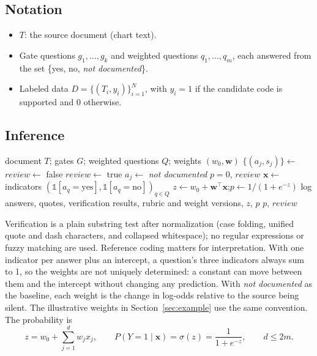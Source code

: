 \documentclass[10pt,letterpaper]{article}
\newcommand{\nd}{\textit{not documented}}
\newcommand{\ind}{\mathbb{1}}
\begin{document}
\FloatBarrier
\subsection{Notation}
\begin{itemize}
  \item $T$: the source document (chart text).
  \item Gate questions $g_1,\dots,g_k$ and weighted questions $q_1,\dots,q_m$, each answered from the set \{yes, no, \nd\}.
  \item Labeled data $D=\{(T_i,y_i)\}_{i=1}^{N}$, with $y_i=1$ if the candidate code is supported and 0 otherwise.
\end{itemize}

\FloatBarrier
\subsection{Inference}

\begin{algorithm}[h]
\caption{Scoring one document with a frozen weight table}
\begin{algorithmic}[1]
\Require document $T$; gates $G$; weighted questions $Q$; weights $(w_0,\mathbf{w})$
\State $\{(a_j,s_j)\}\gets$  
\State $\mathit{review}\gets$ false
     \State $\mathit{review}\gets$ true \EndIf
    \State $a_j\gets$ \nd {}
  \EndIf
\EndFor
{} \State \Return $p=0$, $\mathit{review}$ \EndIf
\State $\mathbf{x}\gets$ indicators $(\ind[a_q=\text{yes}],\ind[a_q=\text{no}])_{q\in Q}$ \Comment{\nd{} is the reference}
\State $z\gets w_0+\mathbf{w}^\top\mathbf{x}$;\quad $p\gets 1/(1+e^{-z})$
\State log answers, quotes, verification results, rubric and weight versions, $z$, $p$
\State \Return $p$, $\mathit{review}$ 
\end{algorithmic}
\end{algorithm}

Verification is a plain substring test after normalization (case folding, unified quote and dash characters, and collapsed whitespace); no regular expressions or fuzzy matching are used. Reference coding matters for interpretation. With one indicator per answer plus an intercept, a question's three indicators always sum to 1, so the weights are not uniquely determined: a constant can move between them and the intercept without changing any prediction. With \nd{} as the baseline, each weight is the change in log-odds relative to the source being silent. The illustrative weights in Section~\ref{sec:example} use the same convention. The probability is
\begin{equation}
z=w_0+\sum_{j=1}^{d}w_jx_j,\qquad P(Y=1\mid\mathbf{x})=\sigma(z)=\frac{1}{1+e^{-z}},\qquad d\le 2m.
\end{equation}
\end{document}
